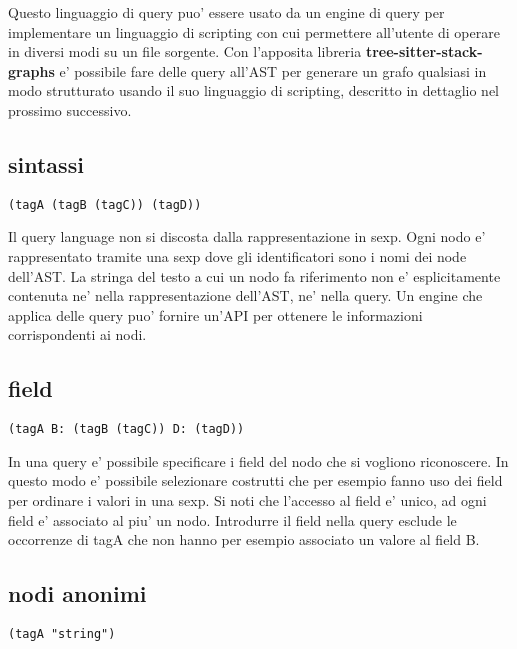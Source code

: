 Questo linguaggio di query puo' essere usato da un engine di query per implementare un linguaggio di scripting con cui permettere all'utente di operare in diversi modi su un file sorgente.
Con l'apposita libreria \textbf{tree-sitter-stack-graphs} e' possibile fare delle query all'AST per generare un grafo qualsiasi in modo strutturato usando il suo linguaggio di scripting, descritto in dettaglio nel prossimo successivo.

\subsection{sintassi}

\begin{Verbatim}[samepage=true]
(tagA (tagB (tagC)) (tagD))
\end{Verbatim}

Il query language non si discosta dalla rappresentazione in sexp.
Ogni nodo e' rappresentato tramite una sexp dove gli identificatori sono i nomi dei node dell'AST.
La stringa del testo a cui un nodo fa riferimento non e' esplicitamente contenuta ne' nella rappresentazione dell'AST, ne' nella query.
Un engine che applica delle query puo' fornire un'API per ottenere le informazioni corrispondenti ai nodi.

\subsection{field}

\begin{Verbatim}[samepage=true]
(tagA B: (tagB (tagC)) D: (tagD))
\end{Verbatim}

In una query e' possibile specificare i field del nodo che si vogliono riconoscere.
In questo modo e' possibile selezionare costrutti che per esempio fanno uso dei field per ordinare i valori in una sexp.
Si noti che l'accesso al field e' unico, ad ogni field e' associato al piu' un nodo.
Introdurre il field nella query esclude le occorrenze di tagA che non hanno per esempio associato un valore al field B.

\subsection{nodi anonimi}

\begin{Verbatim}[samepage=true]
(tagA "string")
\end{Verbatim}

